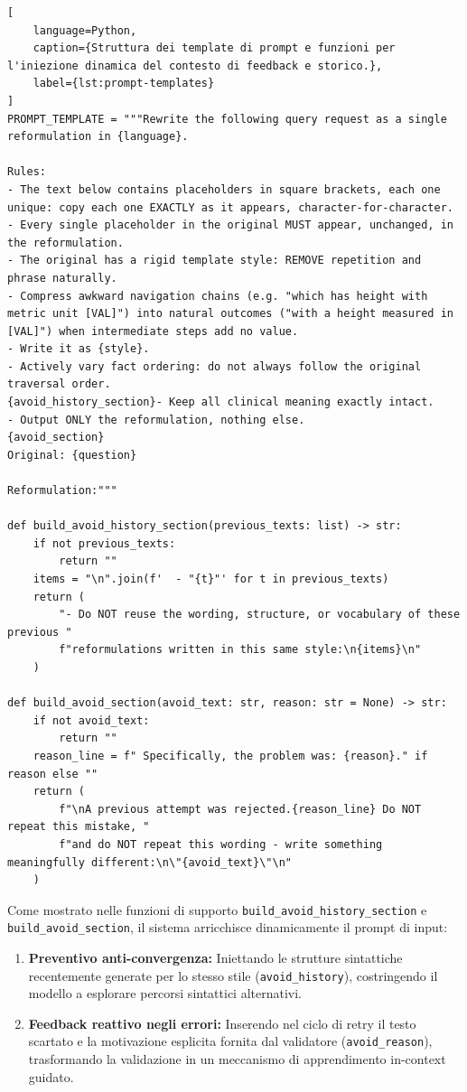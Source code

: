 \documentclass[12pt,a4paper,openright,twoside]{book}
\begin{document}
\begin{lstlisting}[
    language=Python,
    caption={Struttura dei template di prompt e funzioni per l'iniezione dinamica del contesto di feedback e storico.},
    label={lst:prompt-templates}
]
PROMPT_TEMPLATE = """Rewrite the following query request as a single reformulation in {language}.

Rules:
- The text below contains placeholders in square brackets, each one unique: copy each one EXACTLY as it appears, character-for-character.
- Every single placeholder in the original MUST appear, unchanged, in the reformulation.
- The original has a rigid template style: REMOVE repetition and phrase naturally.
- Compress awkward navigation chains (e.g. "which has height with metric unit [VAL]") into natural outcomes ("with a height measured in [VAL]") when intermediate steps add no value.
- Write it as {style}.
- Actively vary fact ordering: do not always follow the original traversal order.
{avoid_history_section}- Keep all clinical meaning exactly intact.
- Output ONLY the reformulation, nothing else.
{avoid_section}
Original: {question}

Reformulation:"""

def build_avoid_history_section(previous_texts: list) -> str:
    if not previous_texts:
        return ""
    items = "\n".join(f'  - "{t}"' for t in previous_texts)
    return (
        "- Do NOT reuse the wording, structure, or vocabulary of these previous "
        f"reformulations written in this same style:\n{items}\n"
    )

def build_avoid_section(avoid_text: str, reason: str = None) -> str:
    if not avoid_text:
        return ""
    reason_line = f" Specifically, the problem was: {reason}." if reason else ""
    return (
        f"\nA previous attempt was rejected.{reason_line} Do NOT repeat this mistake, "
        f"and do NOT repeat this wording - write something meaningfully different:\n\"{avoid_text}\"\n"
    )
\end{lstlisting}

Come mostrato nelle funzioni di supporto \texttt{build\_avoid\_history\_section}
e \texttt{build\_avoid\_section}, il sistema arricchisce dinamicamente il prompt
di input:
\begin{enumerate}
    \item \textbf{Preventivo anti-convergenza:} Iniettando le strutture
          sintattiche recentemente generate per lo stesso stile
          (\texttt{avoid\_history}), costringendo il modello a esplorare
          percorsi sintattici alternativi.
    \item \textbf{Feedback reattivo negli errori:} Inserendo nel ciclo di retry
          il testo scartato e la motivazione esplicita fornita dal validatore
          (\texttt{avoid\_reason}), trasformando la validazione in un meccanismo
          di apprendimento in-context guidato.
\end{enumerate}
\end{document}
